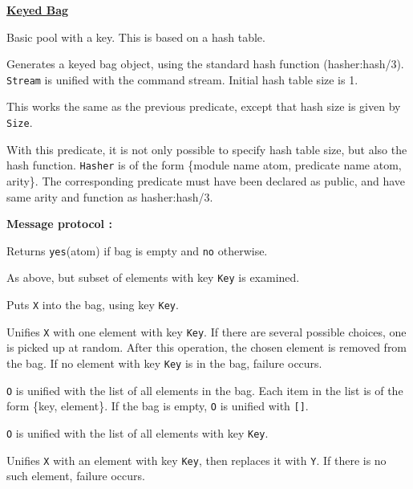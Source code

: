 \noindent\underline{\bf Keyed Bag}\vspace{1ex}\par
Basic pool with a key. This is based on a hash table.
\begin{itemize}

Generates a keyed bag object, using the standard hash function
(hasher:hash/3). \verb|Stream|
is unified with the command stream. Initial hash table size is 1.

This works the same as the previous predicate,
except that hash size is given by \verb|Size|.

With this predicate, it is not only possible to specify hash table size,
but also the hash function. \verb|Hasher| is of the form \{module name atom,
predicate name atom, arity\}. The corresponding predicate must have been
declared as public, and have same arity and function as hasher:hash/3.

\end{itemize}
{\bf Message protocol :}
\begin{itemize}

Returns \verb|yes|(atom) if bag is empty and \verb|no| otherwise.

As above, but subset of elements with key \verb|Key| is examined.

Puts \verb|X| into the bag, using key \verb|Key|.

Unifies \verb|X| with one element with key \verb|Key|. If there are several
possible choices, one is picked up at random. After this operation, the
chosen element is removed from the bag. If no element with key \verb|Key| is
in the bag, failure occurs.

\verb|O| is unified with the list of all elements in the bag.
Each item in the list
is of the form \{key, element\}. If the bag is empty, \verb|O| is unified
with \verb|[]|.

\verb|O| is unified with the list of all elements with key \verb|Key|.

Unifies \verb|X| with an element with key \verb|Key|, then replaces it with
\verb|Y|. If there is no such element, failure occurs.
\end{itemize}
\vspace{1ex}

